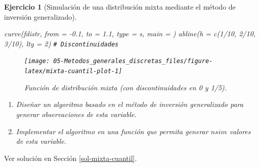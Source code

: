 \documentclass[
]{book}
\newenvironment{Shaded}{\begin{snugshade}}{\end{snugshade}}
\newcommand{\AttributeTok}[1]{\textcolor[rgb]{0.77,0.63,0.00}{#1}}
\newcommand{\CommentTok}[1]{\textcolor[rgb]{0.56,0.35,0.01}{\textit{#1}}}
\newcommand{\DecValTok}[1]{\textcolor[rgb]{0.00,0.00,0.81}{#1}}
\newcommand{\FloatTok}[1]{\textcolor[rgb]{0.00,0.00,0.81}{#1}}
\newcommand{\FunctionTok}[1]{\textcolor[rgb]{0.00,0.00,0.00}{#1}}
\newcommand{\NormalTok}[1]{#1}
\newcommand{\SpecialCharTok}[1]{\textcolor[rgb]{0.00,0.00,0.00}{#1}}
\newcommand{\StringTok}[1]{\textcolor[rgb]{0.31,0.60,0.02}{#1}}
\theoremstyle{break}
\newtheorem{exercise}{Ejercicio}[chapter]
\theoremstyle{nonumberplain}
\renewcommand{\CommentTok}[1]{\textcolor[rgb]{0.41,0.41,0.41}{\texttt{#1}}}
\begin{document}
\begin{exercise}[Simulación de una distribución mixta mediante el método de inversión generalizado]
\begin{Shaded}
\begin{Highlighting}[]
\FunctionTok{curve}\NormalTok{(fdistr, }\AttributeTok{from =} \SpecialCharTok{{-}}\FloatTok{0.1}\NormalTok{, }\AttributeTok{to =} \FloatTok{1.1}\NormalTok{, }\AttributeTok{type =} \StringTok{\textquotesingle{}s\textquotesingle{}}\NormalTok{, }\AttributeTok{main =} \StringTok{\textquotesingle{}\textquotesingle{}}\NormalTok{)}
\FunctionTok{abline}\NormalTok{(}\AttributeTok{h =} \FunctionTok{c}\NormalTok{(}\DecValTok{1}\SpecialCharTok{/}\DecValTok{10}\NormalTok{, }\DecValTok{2}\SpecialCharTok{/}\DecValTok{10}\NormalTok{, }\DecValTok{3}\SpecialCharTok{/}\DecValTok{10}\NormalTok{), }\AttributeTok{lty =} \DecValTok{2}\NormalTok{) }\CommentTok{\# Discontinuidades}
\end{Highlighting}
\end{Shaded}

\begin{figure}[!htb]

{\centering \texttt{[image: 05-Metodos\_generales\_discretas\_files/figure-latex/mixta-cuantil-plot-1]} 

}

\caption{Función de distribución mixta (con discontinuidades en 0 y 1/5).}\label{fig:mixta-cuantil-plot}
\end{figure}

\begin{enumerate}
\def\labelenumi{\alph{enumi})}
\item
  Diseñar un algoritmo basado en el método de inversión generalizado
  para generar observaciones de esta variable.
\item
  Implementar el algoritmo en una función que permita generar \(nsim\)
  valores de esta variable.
\end{enumerate}

\end{exercise}

Ver solución en Sección \ref{sol-mixta-cuantil}.
\end{document}
